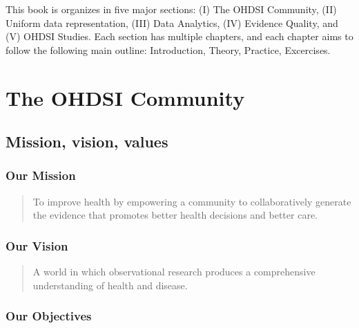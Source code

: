 \documentclass[11pt]{book}
\begin{document}
This book is organizes in five major sections: (I) The OHDSI Community,
(II) Uniform data representation, (III) Data Analytics, (IV) Evidence
Quality, and (V) OHDSI Studies. Each section has multiple chapters, and
each chapter aims to follow the following main outline: Introduction,
Theory, Practice, Excercises.

\part{The OHDSI Community}\label{part-the-ohdsi-community}

\chapter{Mission, vision, values}\label{MissionVissionValues}

\section{Our Mission}\label{our-mission}

\begin{quote}
To improve health by empowering a community to collaboratively generate
the evidence that promotes better health decisions and better care.
\end{quote}

\section{Our Vision}\label{our-vision}

\begin{quote}
A world in which observational research produces a comprehensive
understanding of health and disease.
\end{quote}

\section{Our Objectives}\label{our-objectives}
\end{document}

